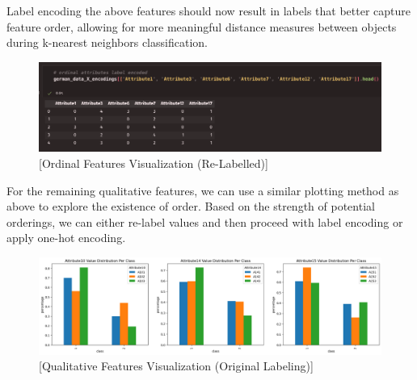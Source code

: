 \documentclass{article}
\begin{document}
    Label encoding the above features should now result in labels that better capture feature order, allowing for more meaningful distance measures between objects
    during k-nearest neighbors classification.
    \begin{figure}[H]
        \centering
        \includegraphics[width=\textwidth, height=0.15\textheight]{./I_1_g_e.png}
        \caption{[Ordinal Features Visualization (Re-Labelled)]}
    \end{figure}



    For the remaining qualitative features, we can use a similar plotting method as above to explore the existence of order.
    Based on the strength of potential orderings, we can either re-label values and then proceed with label encoding or apply one-hot encoding.

    \begin{figure}[H]
        \centering
        \includegraphics[width=\textwidth, height=0.2\textheight]{./I_1_g_f.png}
        \caption{[Qualitative Features Visualization (Original Labeling)]}
    \end{figure}
    
\end{document}
